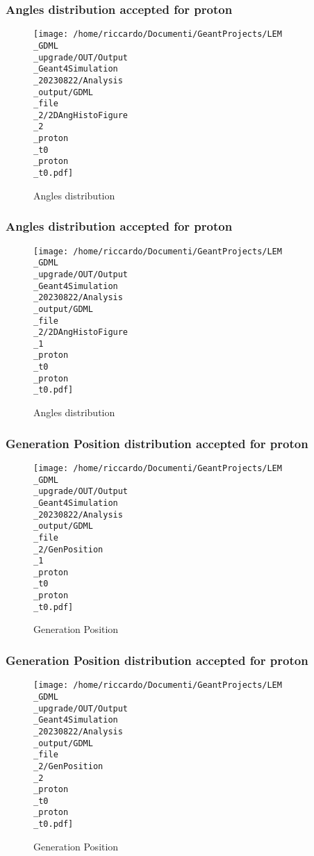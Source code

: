 \documentclass[8pt]{beamer}
\begin{document}
            \begin{frame}
                \frametitle{Angles distribution accepted for proton}
            
        \begin{figure}[h]
            \centering
            \texttt{[image: /home/riccardo/Documenti/GeantProjects/LEM\\\_GDML\\\_upgrade/OUT/Output\\\_Geant4Simulation\\\_20230822/Analysis\\\_output/GDML\\\_file\\\_2/2DAngHistoFigure\\\_2\\\_proton\\\_t0\\\_proton\\\_t0.pdf]}
            \caption{Angles distribution}
        \end{figure}
        
            \end{frame}
            
            \begin{frame}
                \frametitle{Angles distribution accepted for proton}
            
        \begin{figure}[h]
            \centering
            \texttt{[image: /home/riccardo/Documenti/GeantProjects/LEM\\\_GDML\\\_upgrade/OUT/Output\\\_Geant4Simulation\\\_20230822/Analysis\\\_output/GDML\\\_file\\\_2/2DAngHistoFigure\\\_1\\\_proton\\\_t0\\\_proton\\\_t0.pdf]}
            \caption{Angles distribution}
        \end{figure}
        
            \end{frame}
            
            \begin{frame}
                \frametitle{Generation Position distribution accepted for proton}
            
        \begin{figure}[h]
            \centering
            \texttt{[image: /home/riccardo/Documenti/GeantProjects/LEM\\\_GDML\\\_upgrade/OUT/Output\\\_Geant4Simulation\\\_20230822/Analysis\\\_output/GDML\\\_file\\\_2/GenPosition\\\_1\\\_proton\\\_t0\\\_proton\\\_t0.pdf]}
            \caption{Generation Position}
        \end{figure}
        
            \end{frame}
            
            \begin{frame}
                \frametitle{Generation Position distribution accepted for proton}
            
        \begin{figure}[h]
            \centering
            \texttt{[image: /home/riccardo/Documenti/GeantProjects/LEM\\\_GDML\\\_upgrade/OUT/Output\\\_Geant4Simulation\\\_20230822/Analysis\\\_output/GDML\\\_file\\\_2/GenPosition\\\_2\\\_proton\\\_t0\\\_proton\\\_t0.pdf]}
            \caption{Generation Position}
        \end{figure}
        
            \end{frame}
            
\end{document}
